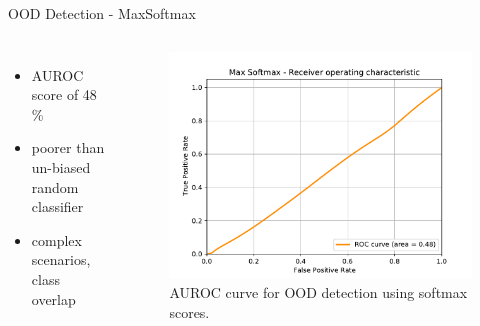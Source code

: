 \documentclass[10pt, aspectratio=169]{beamer}
\begin{document}
\begin{frame}{OOD Detection - MaxSoftmax}
    \begin{columns}
            \begin{itemize}
                \item AUROC score of 48 \%
                \item poorer than un-biased random classifier
                \item complex scenarios, class overlap
            \end{itemize}
            \begin{figure}[!ht]
                \centering
                \includegraphics[scale=0.45]{images/Max Softmax_ROC.pdf}
                \caption[SSD framework]{AUROC curve for OOD detection using softmax scores.}
            \end{figure}
    \end{columns}
\end{frame}
\end{document}
